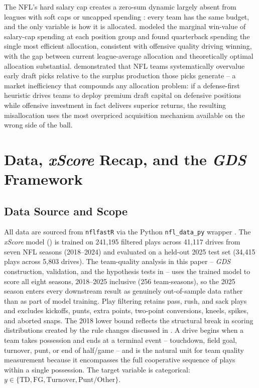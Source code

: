 \documentclass[12pt,a4paper]{article}
\newcommand{\xscore}{\textit{xScore}}
\newcommand{\gds}{\textit{GDS}}
\begin{document}
The NFL's hard salary cap creates a zero-sum dynamic largely absent from leagues with soft caps or uncapped spending \citep{lewis2003moneyball}: every team has the same budget, and the only variable is how it is allocated. \citet{mulholland2019optimizing} modeled the marginal win-value of salary-cap spending at each position group and found quarterback spending the single most efficient allocation, consistent with offensive quality driving winning, with the gap between current league-average allocation and theoretically optimal allocation substantial. \citet{massey2013loserscurse} demonstrated that NFL teams systematically overvalue early draft picks relative to the surplus production those picks generate -- a market inefficiency that compounds any allocation problem: if a defense-first heuristic drives teams to deploy premium draft capital on defensive positions while offensive investment in fact delivers superior returns, the resulting misallocation uses the most overpriced acquisition mechanism available on the wrong side of the ball.

\section{Data, \xscore{} Recap, and the \gds{} Framework}
\label{sec:framework}

\subsection{Data Source and Scope}
\label{sec:data}

All data are sourced from \texttt{nflfastR} \citep{carl2021nflfastr} via the Python \texttt{nfl\_data\_py} wrapper \citep{cooper2023nfldatapy}. The \xscore{} model () is trained on 241,195 filtered plays across 41,117 drives from seven NFL seasons (2018--2024) and evaluated on a held-out 2025 test set (34,415 plays across 5,803 drives). The team-quality analysis in this paper -- \gds{} construction, validation, and the hypothesis tests in  -- uses the trained model to score all eight seasons, 2018--2025 inclusive (256 team-seasons), so the 2025 season enters every downstream result as genuinely out-of-sample data rather than as part of model training. Play filtering retains pass, rush, and sack plays and excludes kickoffs, punts, extra points, two-point conversions, kneels, spikes, and aborted snaps. The 2018 lower bound reflects the structural break in scoring distributions created by the rule changes discussed in  \citep{pereira2018roughing}. A drive begins when a team takes possession and ends at a terminal event -- touchdown, field goal, turnover, punt, or end of half/game -- and is the natural unit for team quality measurement because it encompasses the full cooperative sequence of plays within a single possession. The target variable is categorical: $y \in \{\text{TD}, \text{FG}, \text{Turnover}, \text{Punt/Other}\}$.
\end{document}
